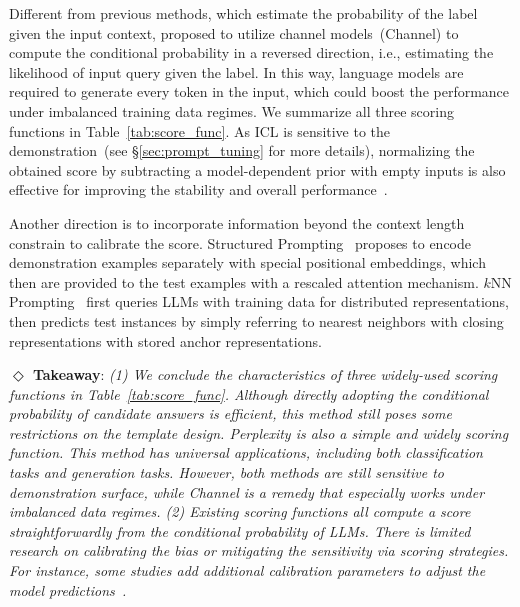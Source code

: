 Different from previous methods, which estimate the probability of the label given the input context, 
\citet{min2022noisy} proposed to utilize channel models~(Channel) to compute the conditional probability in a reversed direction, i.e., estimating the likelihood of input 
query given the label. In this way, language models are required to generate every token in the input, which could boost the performance under imbalanced training data regimes.
We summarize all three scoring functions in Table~\ref{tab:score_func}.
As ICL is sensitive to the demonstration~(see \S\ref{sec:prompt_tuning} for more details), normalizing the obtained score by subtracting a model-dependent prior with empty inputs is also effective for improving the stability and overall performance~\citep{calibrate}.

Another direction is to incorporate information beyond  the context length constrain to calibrate the score.
Structured Prompting~\citep{hao2022structured} proposes to encode demonstration examples separately with special positional embeddings, which then are provided to the test examples with a rescaled attention mechanism.
$k$NN Prompting~\citep{knnPrompting} first queries LLMs with
training data for distributed representations, then predicts test instances by simply referring to nearest neighbors with closing representations with stored anchor representations.

\textbf{$\Diamond$ Takeaway}: \textit{(1) We conclude the characteristics of three widely-used scoring functions in Table~\ref{tab:score_func}. Although directly adopting the conditional probability of candidate answers is efficient, this method still poses some restrictions on the template design. Perplexity is also a simple and widely scoring function. This method has universal applications, including both classification tasks and generation tasks. However, both methods are still sensitive to demonstration surface, while Channel is a remedy that especially works under imbalanced data regimes. (2) Existing scoring functions all compute a score straightforwardly from the conditional probability of LLMs. There is limited research on calibrating the bias or mitigating the sensitivity via scoring strategies. For instance, some studies add additional calibration parameters to adjust the model predictions~\cite{calibrate}. 
}


